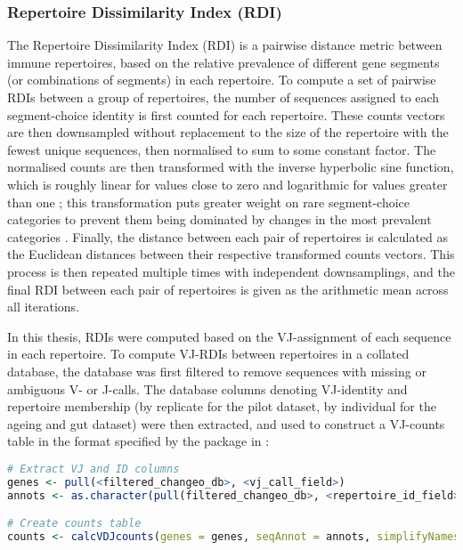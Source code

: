 \subsubsection{Repertoire Dissimilarity Index (RDI)}
\label{sec:methods_comp_igdownstream_rdi}

The Repertoire Dissimilarity Index (RDI) \parencite{bolen2017rdi} is a pairwise distance metric between immune repertoires, based on the relative prevalence of different gene segments (or combinations of segments) in each repertoire. To compute a set of pairwise RDIs between a group of repertoires, the number of sequences assigned to each segment-choice identity is first counted for each repertoire. These counts vectors are then downsampled without replacement to the size of the repertoire with the fewest unique sequences, then normalised to sum to some constant factor. The normalised counts are then transformed with the inverse hyperbolic sine function, which is roughly linear for values close to zero and logarithmic for values greater than one \parencite{bolen2017rdi}; this transformation puts greater weight on rare segment-choice categories to prevent them being dominated by changes in the most prevalent categories \parencite{bolen2017rdi}. Finally, the distance between each pair of repertoires is calculated as the Euclidean distances between their respective transformed counts vectors. This process is then repeated multiple times with independent downsamplings, and the final RDI between each pair of repertoires is given as the arithmetic mean across all iterations.

In this thesis, RDIs were computed based on the VJ-assignment of each sequence in each repertoire. To compute VJ-RDIs between repertoires in a collated  database, the database was first filtered to remove sequences with missing or ambiguous V- or J-calls. The database columns denoting VJ-identity and repertoire membership (by replicate for the pilot dataset, by individual for the ageing and gut dataset) were then extracted, and used to construct a VJ-counts table in the format specified by the  package \parencite{bolen2017rdi} in :

\begin{lstlisting}[language=R]
# Extract VJ and ID columns
genes <- pull(<filtered_changeo_db>, <vj_call_field>)
annots <- as.character(pull(filtered_changeo_db>, <repertoire_id_field>))

# Create counts table
counts <- calcVDJcounts(genes = genes, seqAnnot = annots, simplifyNames = TRUE, splitCommas = FALSE)
\end{lstlisting}

